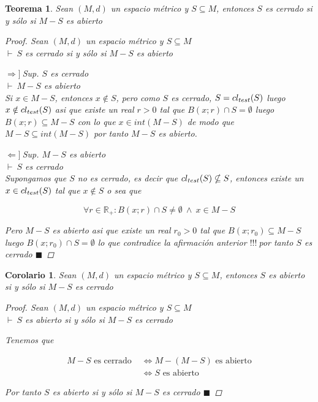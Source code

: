 \documentclass[oneside]{book} %
\theoremstyle{Teorema}
\newtheorem{Teorema}[Definicion]{Teorema}
\newtheorem{Corolario}[Definicion]{Corolario}
\theoremstyle{Ejemplos}
\theoremstyle{[Obs]}
\def \test {test}
\newcommand{\cerradura}[2][\test]{\ifx \test #1 {\overline{#2}} \else {cl_{#1}(#2)} \fi} %
\renewcommand{\{}{\left\lbrace} %
\renewcommand{\}}{\right\rbrace} %
\newcommand{\y}{\ \wedge\ } %
\newcommand{\n}{\cap} %
\renewcommand{\sc}{\subseteq} %
\newcommand{\R}{\mathbb{R}} %
\renewcommand{\qed}{$\blacksquare$} %
\newcommand{\pd}{$\vdash\ $} %
\renewcommand{\c}{$!!!\ $} %
\newcommand{\necesidad}{$\Rightarrow]\ $} %
\newcommand{\suficiencia}{$\Leftarrow]\ $} %
\begin{document}
			\begin{Teorema}\setlength{\parindent}{0em}
			
				Sean $(M, d)$ un espacio métrico y $S \sc M$, entonces $S$ es cerrado si y sólo si $M - S$ es abierto

				\begin{proof}
					
					Sean $(M, d)$ un espacio métrico y $S \sc M$ \\ 
					\pd $S$ es cerrado si y sólo si $M - S$ es abierto

					\necesidad Sup. $S$ es cerrado \\ 
					\pd $M - S$ es abierto \\ 
					Si $x \in M - S$, entonces $x \notin S$, pero como $S$ es cerrado, $S = \cerradura{S}$ luego $x \notin \cerradura{S}$ asi que existe un real $r > 0$ tal que $B(x;r) \n S = \emptyset$ luego $B(x;r) \sc M - S$ con lo que $x \in int(M - S)$ de modo que $M - S \sc int(M - S)$ por tanto $M - S$ es abierto.

					\suficiencia Sup. $M - S$ es abierto \\ 
					\pd $S$ es cerrado \\ 
					Supongamos que $S$ no es cerrado, es decir que $\cerradura{S} \nsubseteq S$, entonces existe un $x \in \cerradura{S}$ tal que $x \notin S$ o sea que 

					\[ \forall r \in \R_{+} : B(x;r) \n S \neq \emptyset \y x \in M - S \]

					Pero $M - S$ es abierto asi que existe un real $r_0 > 0$ tal que $B(x;r_0) \sc M - S$ luego $B(x;r_0) \n S = \emptyset$ lo que contradice la afirmación anterior \c por tanto $S$ es cerrado \qed

				\end{proof}
			
			\end{Teorema}

			\begin{Corolario}\setlength{\parindent}{0em}
			
				Sean $(M, d)$ un espacio métrico y $S \sc M$, entonces $S$ es abierto si y sólo si $M - S$ es cerrado 

				\begin{proof}
					
					Sean $(M, d)$ un espacio métrico y $S \sc M$ \\ 
					\pd $S$ es abierto si y sólo si $M - S$ es cerrado 

					Tenemos que 

					\begin{align*}
						M - S \text{ es cerrado } & \Leftrightarrow M - (M - S) \text{ es abierto} \\ 
						& \Leftrightarrow S \text{ es abierto}
					\end{align*}

					Por tanto $S$ es abierto si y sólo si $M - S$ es cerrado \qed

				\end{proof}
			
			\end{Corolario}
\end{document}

